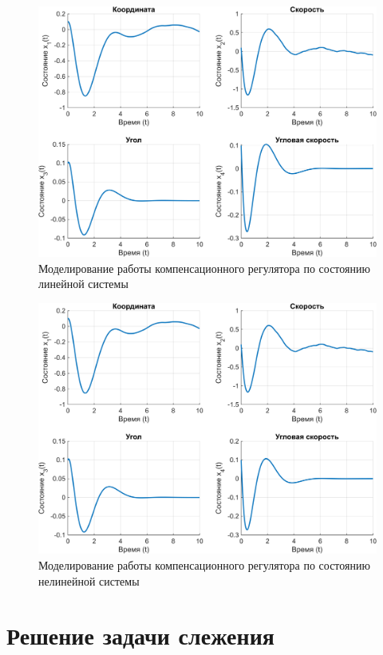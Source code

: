\begin{figure}[H]
    \centering
    \includegraphics[width=\linewidth]{figs/5.1.lin.png}
    \caption{Моделирование работы компенсационного регулятора по состоянию
    линейной системы}
    \label{fig:5.1.lin}
\end{figure}
\begin{figure}[H]
    \centering
    \includegraphics[width=\linewidth]{figs/5.1.nonlin.png}
    \caption{Моделирование работы компенсационного регулятора по состоянию
    нелинейной системы}
    \label{fig:5.1.nonlin}
\end{figure}

\section{Решение задачи слежения}

